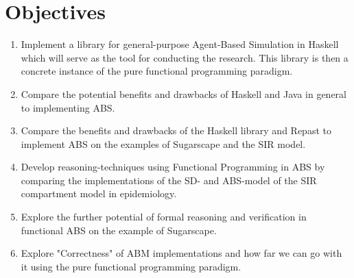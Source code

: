 \section{Objectives}
\begin{enumerate}
	\item Implement a library for general-purpose Agent-Based Simulation in Haskell which will serve as the tool for conducting the research. This library is then a concrete instance of the pure functional programming paradigm.
	
	\item Compare the potential benefits and drawbacks of Haskell and Java in general to implementing ABS.
	
	\item Compare the benefits and drawbacks of the Haskell library and Repast to implement ABS on the examples of Sugarscape and the SIR model.
	
	\item Develop reasoning-techniques using Functional Programming in ABS by comparing the implementations of the SD- and ABS-model of the SIR compartment model in epidemiology.
	
	\item Explore the further potential of formal reasoning and verification in functional ABS on the example of Sugarscape.
	
	\item Explore "Correctness" of ABM implementations and how far we can go with it using the pure functional programming paradigm.
\end{enumerate}

